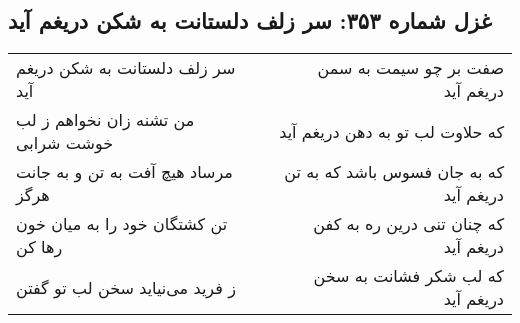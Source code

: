 \begin{center}
\section*{غزل شماره ۳۵۳: سر زلف دلستانت به شکن دریغم آید}
\label{sec:353}
\begin{longtable}{l p{0.5cm} r}
سر زلف دلستانت به شکن دریغم آید
&&
صفت بر چو سیمت به سمن دریغم آید
\\
من تشنه زان نخواهم ز لب خوشت شرابی
&&
که حلاوت لب تو به دهن دریغم آید
\\
مرساد هیچ آفت به تن و به جانت هرگز
&&
که به جان فسوس باشد که به تن دریغم آید
\\
تن کشتگان خود را به میان خون رها کن
&&
که چنان تنی درین ره به کفن دریغم آید
\\
ز فرید می‌نیاید سخن لب تو گفتن
&&
که لب شکر فشانت به سخن دریغم آید
\\
\end{longtable}
\end{center}
